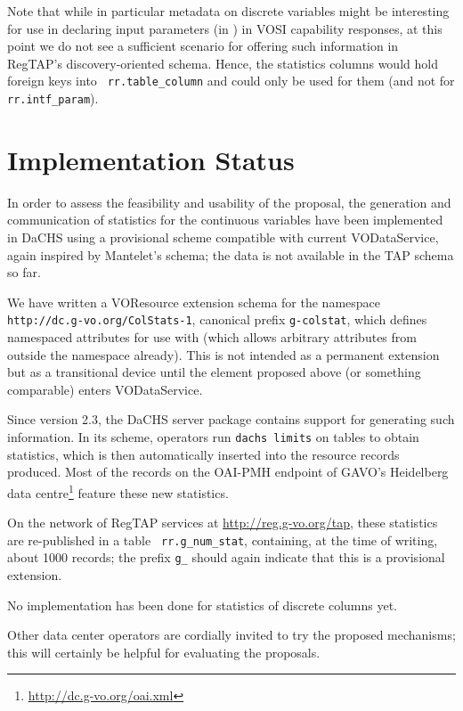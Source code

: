 \documentclass[11pt,a4paper]{ivoa}
\newcommand{\rtent}[1]{\texttt{\color{rtcolor} #1}}
\begin{document}
Note that while in particular metadata on discrete variables might be
interesting for use in declaring input parameters (in
) in VOSI capability responses, at this point we do
not see a sufficient scenario for offering such information in RegTAP's
discovery-oriented schema.  Hence, the statistics columns would hold
foreign keys into \rtent{rr.table\_column} and could only be used for
them (and not for \rtent{rr.intf\_param}).


\section{Implementation Status}

In order to assess the feasibility and usability of the proposal, the
generation and communication of statistics for the continuous variables
have been implemented in DaCHS using a provisional scheme compatible
with current VODataService, again inspired by Mantelet's schema; the
data is not available in the TAP schema so far.

We have written a VOResource extension schema for the namespace
\nolinkurl{http://dc.g-vo.org/ColStats-1}, canonical prefix
\verb|g-colstat|, which defines namespaced attributes for use
with  (which allows arbitrary attributes from
outside the namespace already).  This is not intended as a permanent
extension but as a transitional device until the  element
proposed above (or something comparable) enters VODataService.

Since version 2.3, the DaCHS server package \citep{2014A+C.....7...27D}
contains support for
generating such information. In its scheme, operators run 
\verb|dachs limits| 
on tables to obtain statistics, which is then automatically
inserted into the resource records produced.  Most of the records on
the OAI-PMH endpoint of GAVO's Heidelberg data
centre\footnote{\url{http://dc.g-vo.org/oai.xml}} feature these new
statistics.

On the network of RegTAP services at \url{http://reg.g-vo.org/tap},
these
statistics are re-published in a table \rtent{rr.g\_num\_stat},
containing, at the time of writing, about 1000 records; the prefix
\verb|g_| should again indicate that this is a provisional extension.

No implementation has been done for statistics of discrete
columns yet.

Other data center operators are cordially invited to try the proposed
mechanisms; this will certainly be helpful for evaluating the proposals.
\end{document}

